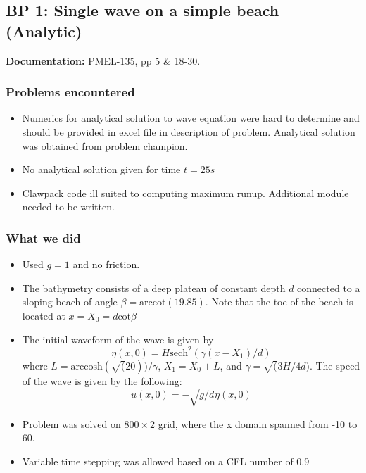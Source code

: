 \newsection
\subsection{BP 1:
  Single wave on a simple beach (Analytic)}

{\bf Documentation:}  PMEL-135, pp 5 \&
18-30.\cite{SynolakisBernard:pmel135}

\subsubsection{Problems encountered}

\begin{itemize}
\item Numerics for analytical solution to wave equation were hard to determine and should be provided in excel file in description of problem. Analytical solution was obtained from problem champion.
\item No analytical solution given for time $t = 25s$
\item Clawpack code ill suited to computing maximum runup. Additional module needed to be written. 
\end{itemize}

\subsubsection{What we did}

\begin{itemize}
\item Used $g=1$ and no friction.
\item The bathymetry consists of a deep plateau of constant depth $d$
connected to a sloping beach of angle $\beta = \text{arccot}(19.85)$. 
Note that the toe of the beach is located at $x = X_0 = d \text{cot} \beta$
\item The initial waveform of the wave is given by 
\begin{equation}
\eta(x,0) = H \text{sech}^2(\gamma (x - X_1)/d)
\end{equation}
where $L = \text{arccosh}(\sqrt(20))/\gamma$, $X_1 = X_0 + L$, 
and $\gamma = \sqrt(3H/4d)$. The speed of the wave is given by the following: 
\begin{equation}
u(x,0)=-\sqrt{g/d}\eta(x,0)
\end{equation}
\item Problem was solved on $800\times 2$ grid, where the x domain spanned from -10 to 60.
\item Variable time stepping was allowed based on a CFL number of 0.9
\end{itemize} 

